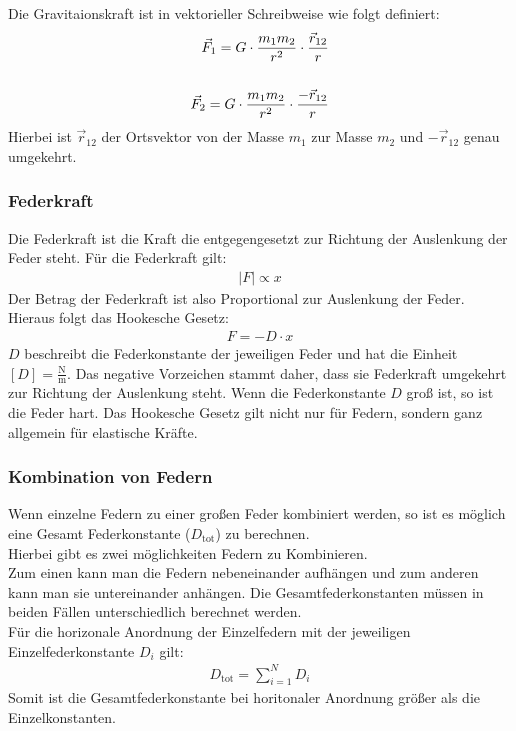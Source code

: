\documentclass{article}
\begin{document}
\noindent Die Gravitaionskraft ist in vektorieller Schreibweise wie folgt definiert:
\begin{align}
\vec{F}_1=G\cdot \frac{m_1m_2}{r^2}\cdot \frac{\vec{r}_{12}}{r}\\
\notag\\
\vec{F}_2=G\cdot \frac{m_1m_2}{r^2}\cdot \frac{-\vec{r}_{12}}{r}
\end{align}
Hierbei ist $\vec{r}_{12}$ der Ortsvektor von der Masse $m_1$ zur Masse $m_2$ und $-\vec{r}_{12}$ genau umgekehrt.


\subsubsection{Federkraft}
Die Federkraft ist die Kraft die entgegengesetzt zur Richtung der Auslenkung der Feder steht. 
Für die Federkraft gilt:
\begin{align}
    |F| \propto x
\end{align}
Der Betrag der Federkraft ist also Proportional zur Auslenkung der Feder. Hieraus folgt das Hookesche Gesetz:
\begin{align}
    F=-D\cdot x
\end{align}
$D$ beschreibt die Federkonstante der jeweiligen Feder und hat die Einheit \\$[D]=\frac{\mathrm{N}}{\mathrm{m}}$. Das negative Vorzeichen
stammt daher, dass sie Federkraft umgekehrt zur Richtung der Auslenkung steht. Wenn die Federkonstante $D$ groß ist, so ist die Feder hart.
Das Hookesche Gesetz gilt nicht nur für Federn, sondern ganz allgemein für elastische Kräfte.

\subsubsection{Kombination von Federn}
Wenn einzelne Federn zu einer großen Feder kombiniert werden, so ist es möglich eine Gesamt Federkonstante ($D_\mathrm{tot}$)
zu berechnen.\\

\noindent Hierbei gibt es zwei möglichkeiten Federn zu Kombinieren.\\
Zum einen kann man die Federn nebeneinander aufhängen und zum anderen kann man sie untereinander anhängen.
Die Gesamtfederkonstanten müssen in beiden Fällen unterschiedlich berechnet werden.\\

\noindent Für die horizonale Anordnung der Einzelfedern mit der jeweiligen Einzelfederkonstante $D_i$ gilt:
\begin{align}
    D_\mathrm{tot}=\sum_{i=1}^{N}D_i
\end{align}
Somit ist die Gesamtfederkonstante bei horitonaler Anordnung größer als die Einzelkonstanten.\\
\end{document}
